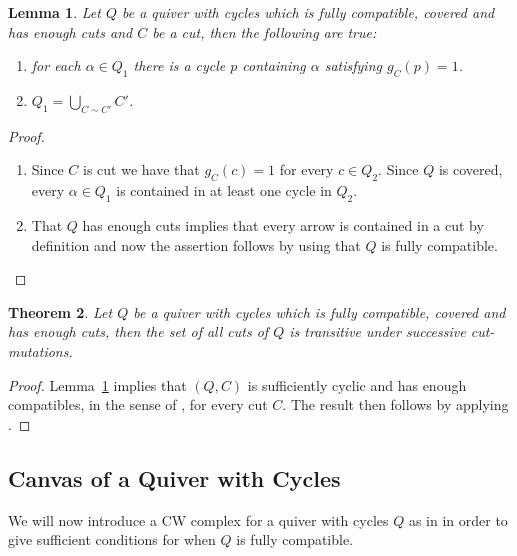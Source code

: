 \documentclass[a4paper, reqno]{amsart}
\newtheorem{mythm}{Theorem}[section]
\newtheorem{mylemma}[mythm]{Lemma}
\theoremstyle{definition}
\begin{document}
\begin{mylemma}\label{lemma - Q suff cyclic and enouch comp}
	Let $Q$ be a quiver with cycles which is fully compatible, covered and has enough cuts and $C$ be a cut, then the following are true:
	\begin{enumerate}
		\item for each $\alpha\in Q_1$ there is a cycle $p$ containing $\alpha$ satisfying $g_C(p)= 1$.
		\item $Q_1 = \bigcup_{C \sim C'}C'$.
	\end{enumerate}
\end{mylemma}

\begin{proof}
	\begin{enumerate}
		\item Since $C$ is cut we have that $g_C(c) = 1$ for every $c\in Q_2$. Since $Q$ is covered, every $\alpha\in Q_1$ is contained in at least one cycle in $Q_2$.
		\item That $Q$ has enough cuts implies that every arrow is contained in a cut by definition and now the assertion follows by using that $Q$ is fully compatible.
	\end{enumerate}
\end{proof}

\begin{mythm}\label{theorem - qwc fully, covered enough implies trans}
	Let $Q$ be a quiver with cycles which is fully compatible, covered and has enough cuts, then the set of all cuts of $Q$ is transitive under successive cut-mutations.
\end{mythm}

\begin{proof}
	Lemma~\ref{lemma - Q suff cyclic and enouch comp} implies that $(Q, C)$ is sufficiently cyclic and has enough compatibles, in the sense of \cite[Definition 6.15]{HerschendOsamu2011quiverwithpotential}, for every cut $C$. The result then follows by applying \cite[Theorem 7.2]{HerschendOsamu2011quiverwithpotential}.
\end{proof}

\subsection{Canvas of a Quiver with Cycles}We will now introduce a CW complex for a quiver with cycles $Q$ as in \cite{HerschendOsamu2011quiverwithpotential} in order to give sufficient conditions for when $Q$ is fully compatible.
\end{document}
